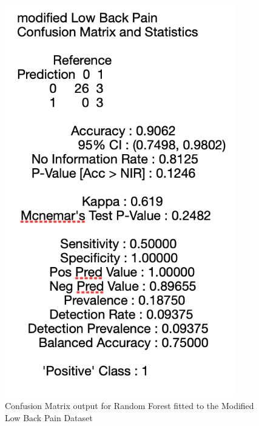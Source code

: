\begin{figure}[!htbp]
\begin{minipage}{0.45\textwidth}
        \includegraphics[width=0.9\textwidth]{ThesisTemplate/appendix/images/Chapter5Appendix/ConfusionMatrix/modLowBackPain.png} 
        \caption{Confusion Matrix output for Random Forest fitted to the Modified Low Back Pain Dataset}
        \label{fig:my_label}
    \end{minipage}
\end{figure}


